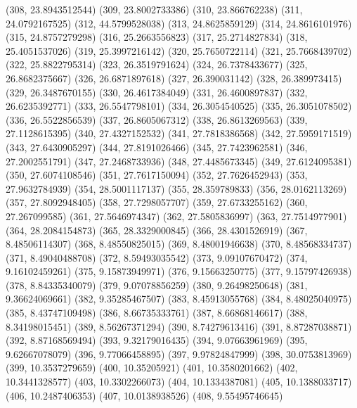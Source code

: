 {					(308, 23.8943512544)
					(309, 23.8002733386)
					(310, 23.866762238)
					(311, 24.0792167525)
					(312, 44.5799528038)
					(313, 24.8625859129)
					(314, 24.8616101976)
					(315, 24.8757279298)
					(316, 25.2663556823)
					(317, 25.2714827834)
					(318, 25.4051537026)
					(319, 25.3997216142)
					(320, 25.7650722114)
					(321, 25.7668439702)
					(322, 25.8822795314)
					(323, 26.3519791624)
					(324, 26.7378433677)
					(325, 26.8682375667)
					(326, 26.6871897618)
					(327, 26.390031142)
					(328, 26.389973415)
					(329, 26.3487670155)
					(330, 26.4617384049)
					(331, 26.4600897837)
					(332, 26.6235392771)
					(333, 26.5547798101)
					(334, 26.3054540525)
					(335, 26.3051078502)
					(336, 26.5522856539)
					(337, 26.8605067312)
					(338, 26.8613269563)
					(339, 27.1128615395)
					(340, 27.4327152532)
					(341, 27.7818386568)
					(342, 27.5959171519)
					(343, 27.6430905297)
					(344, 27.8191026466)
					(345, 27.7423962581)
					(346, 27.2002551791)
					(347, 27.2468733936)
					(348, 27.4485673345)
					(349, 27.6124095381)
					(350, 27.6074108546)
					(351, 27.7617150094)
					(352, 27.7626452943)
					(353, 27.9632784939)
					(354, 28.5001117137)
					(355, 28.359789833)
					(356, 28.0162113269)
					(357, 27.8092948405)
					(358, 27.7298057707)
					(359, 27.6733255162)
					(360, 27.267099585)
					(361, 27.5646974347)
					(362, 27.5805836997)
					(363, 27.7514977901)
					(364, 28.2084154873)
					(365, 28.3329000845)
					(366, 28.4301526919)
					(367, 8.48506114307)
					(368, 8.48550825015)
					(369, 8.48001946638)
					(370, 8.48568334737)
					(371, 8.49040488708)
					(372, 8.59493035542)
					(373, 9.09107670472)
					(374, 9.16102459261)
					(375, 9.15873949971)
					(376, 9.15663250775)
					(377, 9.15797426938)
					(378, 8.84335340079)
					(379, 9.07078856259)
					(380, 9.26498250648)
					(381, 9.36624069661)
					(382, 9.35285467507)
					(383, 8.45913055768)
					(384, 8.48025040975)
					(385, 8.43747109498)
					(386, 8.66735333761)
					(387, 8.66868146617)
					(388, 8.34198015451)
					(389, 8.56267371294)
					(390, 8.74279613416)
					(391, 8.87287038871)
					(392, 8.87168569494)
					(393, 9.32179016435)
					(394, 9.07663961969)
					(395, 9.62667078079)
					(396, 9.77066458895)
					(397, 9.97824847999)
					(398, 30.0753813969)
					(399, 10.3537279659)
					(400, 10.35205921)
					(401, 10.3580201662)
					(402, 10.3441328577)
					(403, 10.3302266073)
					(404, 10.1334387081)
					(405, 10.1388033717)
					(406, 10.2487406353)
					(407, 10.0138938526)
					(408, 9.55495746645)
}
